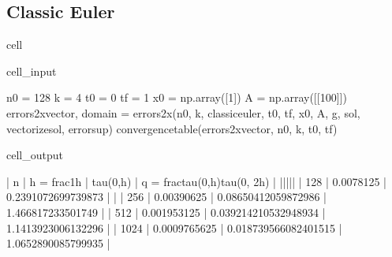\documentclass[letterpaper,10pt,english]{jupyterBook}
\begin{document}
\subsection{Classic Euler}
\label{\detokenize{appendix:classic-euler}}
\begin{sphinxuseclass}{cell}\begin{sphinxVerbatimInput}

\begin{sphinxuseclass}{cell_input}
\begin{sphinxVerbatim}[commandchars=\\\{\}]
n0 = 128
k = 4
t0 = 0
tf = 1
x0 = np.array([1])
A = np.array([[100]])
errors\PYGZus{}2x\PYGZus{}vector, domain = errors\PYGZus{}2x(n0, k, classic\PYGZus{}euler, t0, tf, x0, A, g, sol, vectorize\PYGZus{}sol, error\PYGZus{}sup)
convergence\PYGZus{}table(errors\PYGZus{}2x\PYGZus{}vector, n0, k, t0, tf)
\end{sphinxVerbatim}

\end{sphinxuseclass}\end{sphinxVerbatimInput}
\begin{sphinxVerbatimOutput}

\begin{sphinxuseclass}{cell_output}
\begin{sphinxVerbatim}[commandchars=\\\{\}]
| n | h = \PYGZdl{}\PYGZbs{}frac\PYGZob{}1\PYGZcb{}\PYGZob{}h\PYGZcb{}\PYGZdl{} | \PYGZdl{}\PYGZbs{}tau(0,h)\PYGZdl{} | q = \PYGZdl{}\PYGZbs{}frac\PYGZob{}tau(0,h)\PYGZcb{}\PYGZob{}tau(0, 2h)\PYGZcb{}\PYGZdl{} |
|\PYGZhy{}\PYGZhy{}\PYGZhy{}|\PYGZhy{}\PYGZhy{}\PYGZhy{}\PYGZhy{}\PYGZhy{}\PYGZhy{}\PYGZhy{}\PYGZhy{}\PYGZhy{}\PYGZhy{}\PYGZhy{}\PYGZhy{}\PYGZhy{}\PYGZhy{}\PYGZhy{}\PYGZhy{}\PYGZhy{}|\PYGZhy{}\PYGZhy{}\PYGZhy{}\PYGZhy{}\PYGZhy{}\PYGZhy{}\PYGZhy{}\PYGZhy{}\PYGZhy{}\PYGZhy{}\PYGZhy{}|\PYGZhy{}\PYGZhy{}\PYGZhy{}\PYGZhy{}\PYGZhy{}\PYGZhy{}\PYGZhy{}\PYGZhy{}\PYGZhy{}\PYGZhy{}\PYGZhy{}\PYGZhy{}\PYGZhy{}\PYGZhy{}\PYGZhy{}\PYGZhy{}\PYGZhy{}\PYGZhy{}\PYGZhy{}\PYGZhy{}\PYGZhy{}\PYGZhy{}\PYGZhy{}\PYGZhy{}\PYGZhy{}\PYGZhy{}\PYGZhy{}\PYGZhy{}\PYGZhy{}\PYGZhy{}\PYGZhy{}\PYGZhy{}\PYGZhy{}|
 | 128 | 0.0078125 | 0.2391072699739873 | \PYGZhy{} | 
 | 256 | 0.00390625 | 0.08650412059872986 | 1.466817233501749 | 
 | 512 | 0.001953125 | 0.039214210532948934 | 1.1413923006132296 | 
 | 1024 | 0.0009765625 | 0.018739566082401515 | 1.0652890085799935 | 
\end{sphinxVerbatim}

\end{sphinxuseclass}\end{sphinxVerbatimOutput}

\end{sphinxuseclass}
\end{document}
